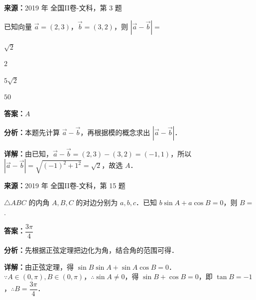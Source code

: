 \begin{question}[points=5]
\textbf{来源：}2019 年 全国II卷-文科，第 3 题\par
已知向量 $\vec{a}=(2,3)$，$\vec{b}=(3,2)$，则 $|\vec{a}-\vec{b}|=$
\begin{choices}
  \item $\sqrt{2}$
  \item $2$
  \item $5\sqrt{2}$
  \item $50$
\end{choices}
\begin{solution}
\textbf{答案：}$A$

\textbf{分析：}本题先计算 $\vec{a}-\vec{b}$，再根据模的概念求出 $|\vec{a}-\vec{b}|$．

\textbf{详解：}由已知，$\vec{a}-\vec{b}=(2,3)-(3,2)=(-1,1)$，所以 $|\vec{a}-\vec{b}|=\sqrt{(-1)^2+1^2}=\sqrt{2}$，故选 $A$．
\end{solution}
\end{question}

\begin{question}[points=5]
\textbf{来源：}2019 年 全国II卷-文科，第 15 题\par
$\triangle ABC$ 的内角 $A,B,C$ 的对边分别为 $a,b,c$．已知 $b\sin A+a\cos B=0$，则 $B=$.
\fillin[{$\dfrac{3\pi}{4}$}]
\begin{solution}
\textbf{答案：}$\dfrac{3\pi}{4}$

\textbf{分析：}先根据正弦定理把边化为角，结合角的范围可得．

\textbf{详解：}由正弦定理，得 $\sin B\sin A+\sin A\cos B=0$．$\because A\in(0,\pi),B\in(0,\pi)$，$\therefore \sin A\neq 0$，得 $\sin B+\cos B=0$，即 $\tan B=-1$，$\therefore B=\dfrac{3\pi}{4}$．
\end{solution}
\end{question}

